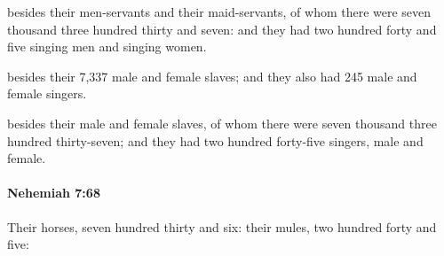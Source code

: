 			\begin{versebox}
					\item[BHS] 
					\item[LXX] 
					\item[ASV] besides their men-servants and their maid-servants, of whom there were seven thousand three hundred thirty and seven: and they had two hundred forty and five singing men and singing women.
					\item[NIV] besides their 7,337 male and female slaves; and they also had 245 male and female singers.
					\item[NRSV] besides their male and female slaves, of whom there were seven thousand three hundred thirty-seven; and they had two hundred forty-five singers, male and female.
			\end{versebox}

		\paragraph{Nehemiah 7:68} %
			\label{NEHEMIAH-7-68}

			Their horses, seven hundred thirty and six: their mules, two hundred forty and five:

